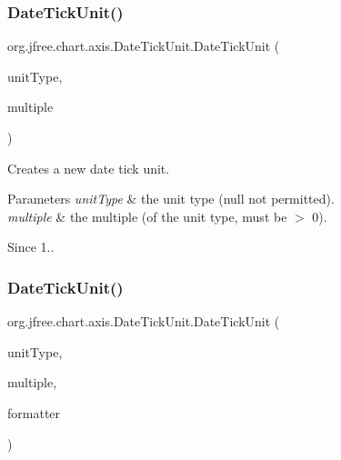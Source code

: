 \subsubsection{\texorpdfstring{Date\+Tick\+Unit()}{DateTickUnit()}\hspace{0.1cm}{\footnotesize\ttfamily [1/6]}}
{\footnotesize\ttfamily org.\+jfree.\+chart.\+axis.\+Date\+Tick\+Unit.\+Date\+Tick\+Unit (\begin{DoxyParamCaption}\item[{\mbox{\hyperlink{classorg_1_1jfree_1_1chart_1_1axis_1_1_date_tick_unit_type}{Date\+Tick\+Unit\+Type}}}]{unit\+Type,  }\item[{int}]{multiple }\end{DoxyParamCaption})}

Creates a new date tick unit.


\begin{DoxyParams}{Parameters}
{\em unit\+Type} & the unit type ({\ttfamily null} not permitted). \\
\hline
{\em multiple} & the multiple (of the unit type, must be $>$ 0).\\
\hline
\end{DoxyParams}
\begin{DoxySince}{Since}
1.. 
\end{DoxySince}
\mbox{\label{classorg_1_1jfree_1_1chart_1_1axis_1_1_date_tick_unit_a065e0304a5da197ed411f8e647d9faad}} 
\subsubsection{\texorpdfstring{Date\+Tick\+Unit()}{DateTickUnit()}\hspace{0.1cm}{\footnotesize\ttfamily [2/6]}}
{\footnotesize\ttfamily org.\+jfree.\+chart.\+axis.\+Date\+Tick\+Unit.\+Date\+Tick\+Unit (\begin{DoxyParamCaption}\item[{\mbox{\hyperlink{classorg_1_1jfree_1_1chart_1_1axis_1_1_date_tick_unit_type}{Date\+Tick\+Unit\+Type}}}]{unit\+Type,  }\item[{int}]{multiple,  }\item[{Date\+Format}]{formatter }\end{DoxyParamCaption})}

